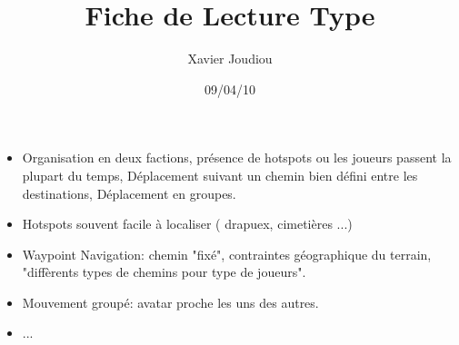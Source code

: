 \documentclass[11pt,a4paper]{article}
\title{Fiche de Lecture Type}
\author{Xavier Joudiou}
\date{09/04/10}
\begin{document}
	
  \begin{itemize}
  \renewcommand{\labelitemi}{$\Rightarrow$}
	\item Organisation en deux factions, présence de hotspots ou les joueurs passent la plupart du temps, Déplacement suivant un chemin bien défini entre les destinations, Déplacement en groupes. 
	\item Hotspots souvent facile à localiser ( drapuex, cimetières ...)
	\item Waypoint Navigation: chemin "fixé", contraintes géographique du terrain, "diffèrents types de chemins pour type de joueurs".
	\item Mouvement groupé: avatar proche les uns des autres.
	\item ...
  \end{itemize}
\end{document}
